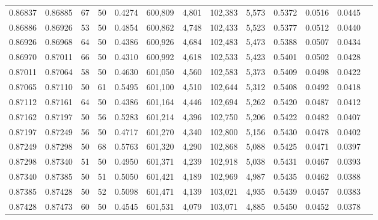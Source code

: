 \begin{tabular}{rrrrrrrrrrrrr}
0.86837 & 0.86885 &    67 &  50 &                                     0.4274 & 600,809 &   4,801 & 102,383 &   5,573 & 0.5372 & 0.0516 & 0.0445 \\
0.86886 & 0.86926 &    53 &  50 &                                     0.4854 & 600,862 &   4,748 & 102,433 &   5,523 & 0.5377 & 0.0512 & 0.0440 \\
0.86926 & 0.86968 &    64 &  50 &                                     0.4386 & 600,926 &   4,684 & 102,483 &   5,473 & 0.5388 & 0.0507 & 0.0434 \\
0.86970 & 0.87011 &    66 &  50 &                                     0.4310 & 600,992 &   4,618 & 102,533 &   5,423 & 0.5401 & 0.0502 & 0.0428 \\
0.87011 & 0.87064 &    58 &  50 &                                     0.4630 & 601,050 &   4,560 & 102,583 &   5,373 & 0.5409 & 0.0498 & 0.0422 \\
0.87065 & 0.87110 &    50 &  61 &                                     0.5495 & 601,100 &   4,510 & 102,644 &   5,312 & 0.5408 & 0.0492 & 0.0418 \\
0.87112 & 0.87161 &    64 &  50 &                                     0.4386 & 601,164 &   4,446 & 102,694 &   5,262 & 0.5420 & 0.0487 & 0.0412 \\
0.87162 & 0.87197 &    50 &  56 &                                     0.5283 & 601,214 &   4,396 & 102,750 &   5,206 & 0.5422 & 0.0482 & 0.0407 \\
0.87197 & 0.87249 &    56 &  50 &                                     0.4717 & 601,270 &   4,340 & 102,800 &   5,156 & 0.5430 & 0.0478 & 0.0402 \\
0.87249 & 0.87298 &    50 &  68 &                                     0.5763 & 601,320 &   4,290 & 102,868 &   5,088 & 0.5425 & 0.0471 & 0.0397 \\
0.87298 & 0.87340 &    51 &  50 &                                     0.4950 & 601,371 &   4,239 & 102,918 &   5,038 & 0.5431 & 0.0467 & 0.0393 \\
0.87340 & 0.87385 &    50 &  51 &                                     0.5050 & 601,421 &   4,189 & 102,969 &   4,987 & 0.5435 & 0.0462 & 0.0388 \\
0.87385 & 0.87428 &    50 &  52 &                                     0.5098 & 601,471 &   4,139 & 103,021 &   4,935 & 0.5439 & 0.0457 & 0.0383 \\
0.87428 & 0.87473 &    60 &  50 &                                     0.4545 & 601,531 &   4,079 & 103,071 &   4,885 & 0.5450 & 0.0452 & 0.0378 \\

\end{tabular}
